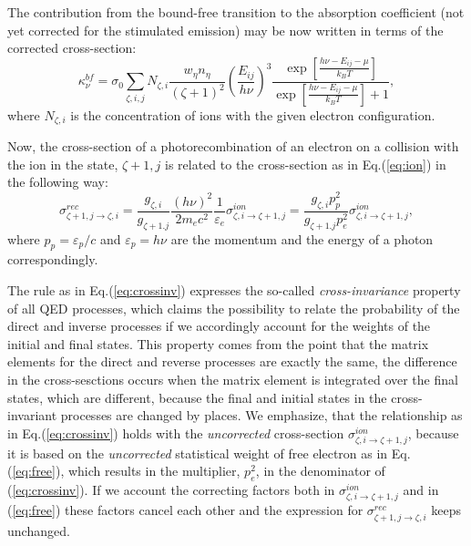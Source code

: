 The contribution from the bound-free transition to the absorption coefficient 
(not yet corrected for the stimulated emission) may be now written in terms of the corrected cross-section:
\begin{equation}\label{eq:finalab}
\kappa^{bf}_{\nu} = \sigma_0\sum_{\zeta,i,j}{N_{\zeta,i} \frac{w_\eta n_\eta}{(\zeta+1)^2}\left(\frac{E_{ij}}{h\nu}\right)^3\frac{\exp[\frac{h\nu - E_{ij} -\mu}{k_BT}]}{\exp[\frac{ h\nu - E_{ij} -\mu}{k_BT}]+1}},
\end{equation}
where $N_{\zeta,i}$ is the concentration of ions with the given electron configuration.

Now, the cross-section of a photorecombination of an electron on a collision 
with the ion in the state, $\zeta +1,j$ is related to the cross-section as in Eq.(\ref{eq:ion}) in the following way:
\begin{equation}\label{eq:crossinv}
\sigma^{rec}_{\zeta+1,j\rightarrow\zeta,i}=
\frac{g_{\zeta,i} } { g_{\zeta+1.j} }\frac{(h\nu)^2} {2m_ec^2}
\frac{1}{\varepsilon_e}
\sigma^{ion}_{\zeta,i\rightarrow \zeta+1,j}=
\frac{g_{\zeta,i}p_p^2}{g_{\zeta+1.j} p_e^2}\sigma^{ion}_{\zeta,i\rightarrow \zeta+1,j},
\end{equation}
where $p_p=\varepsilon_p/c$ and $\varepsilon_p=h\nu$ are the momentum and the energy of a photon correspondingly.

The rule as in Eq.(\ref{eq:crossinv}) expresses the so-called {\it cross-invariance} property of all QED processes, which claims the possibility to relate the probability of
the direct and inverse processes if we accordingly account for the weights of the initial and final states. This property comes from the point that the matrix 
elements for the direct and reverse processes are exactly the same, the difference in the cross-sesctions occurs when the matrix element is integrated over the final 
states, which are different, because the final and initial states in the cross-invariant processes are changed by places. We emphasize, that the relationship as in 
Eq.(\ref{eq:crossinv}) holds with the {\it uncorrected} cross-section  $\sigma^{ion}_{\zeta,i\rightarrow \zeta+1,j}$, because it is based on the {\it uncorrected} 
statistical weight of free electron as in Eq.(\ref{eq:free}), which results in the multiplier, $p_e^2$, in the denominator of (\ref{eq:crossinv}). If we account the 
correcting factors both in $\sigma^{ion}_{\zeta,i\rightarrow \zeta+1,j}$ and in (\ref{eq:free}) these factors cancel each other and the expression for  
$\sigma^{rec}_{\zeta+1,j\rightarrow\zeta,i}$ keeps unchanged.

